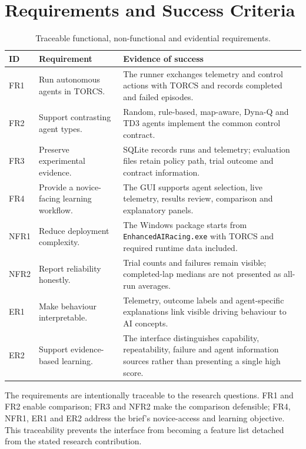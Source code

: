 \section{Requirements and Success Criteria}
\label{ch:requirements}

\begin{table}[htbp]
  \centering
  \caption{Traceable functional, non-functional and evidential requirements.}
  \label{tab:requirements}
  \small
  \begin{tabularx}{\textwidth}{p{}p{}Y}
    \toprule
    ID & Requirement & Evidence of success \\
    \midrule
    FR1 & Run autonomous agents in TORCS. & The runner exchanges telemetry and control actions with TORCS and records completed and failed episodes. \\
    FR2 & Support contrasting agent types. & Random, rule-based, map-aware, Dyna-Q and TD3 agents implement the common control contract. \\
    FR3 & Preserve experimental evidence. & SQLite records runs and telemetry; evaluation files retain policy path, trial outcome and contract information. \\
    FR4 & Provide a novice-facing learning workflow. & The GUI supports agent selection, live telemetry, results review, comparison and explanatory panels. \\
    NFR1 & Reduce deployment complexity. & The Windows package starts from \texttt{EnhancedAIRacing.exe} with TORCS and required runtime data included. \\
    NFR2 & Report reliability honestly. & Trial counts and failures remain visible; completed-lap medians are not presented as all-run averages. \\
    ER1 & Make behaviour interpretable. & Telemetry, outcome labels and agent-specific explanations link visible driving behaviour to AI concepts. \\
    ER2 & Support evidence-based learning. & The interface distinguishes capability, repeatability, failure and agent information sources rather than presenting a single high score. \\
    \bottomrule
  \end{tabularx}
\end{table}

The requirements are intentionally traceable to the research questions. FR1 and FR2 enable comparison; FR3 and NFR2 make the comparison defensible; FR4, NFR1, ER1 and ER2 address the brief's novice-access and learning objective. This traceability prevents the interface from becoming a feature list detached from the stated research contribution.

